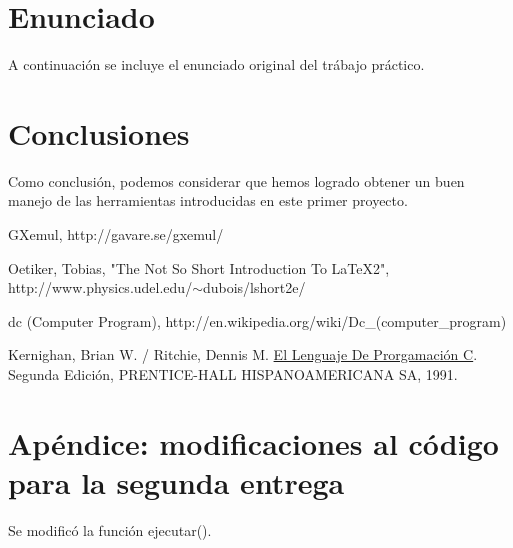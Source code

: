 \documentclass[a4paper,10pt]{article}
\begin{document}
\pagebreak

\section{Enunciado} 

A continuaci\'on se incluye el enunciado original del tr\'abajo pr\'actico.
\pagebreak

\section{Conclusiones}
Como conclusi\'on, podemos considerar que hemos logrado obtener un buen manejo de las herramientas introducidas en este primer proyecto.

\pagebreak

\begin{thebibliography}{99}

 GXemul, http://gavare.se/gxemul/

 Oetiker, Tobias, "The Not So Short Introduction To LaTeX2", http://www.physics.udel.edu/$\sim$dubois/lshort2e/

 dc (Computer Program), http://en.wikipedia.org/wiki/Dc\_(computer\_program)

 Kernighan, Brian W. / Ritchie, Dennis M. \underline{El Lenguaje De Prorgamaci\'on C}. Segunda Edici\'on, PRENTICE-HALL HISPANOAMERICANA SA, 1991.

\end{thebibliography}
\pagebreak

\section{Ap\'endice: modificaciones al c\'odigo para la segunda entrega}

Se modific\'o la funci\'on ejecutar().
\end{document}
